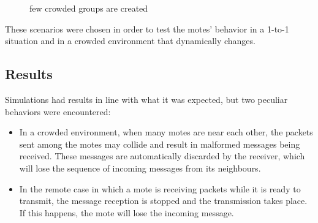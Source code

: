 \documentclass[11pt]{article}
\begin{document}
\begin{figure}[H]
\begin{minipage}{0.32\textwidth}
  \end{minipage}
  \begin{minipage}{0.32\textwidth}
    \centering
    \caption{few crowded groups are created}
    \label{crowded-groups}

  \end{minipage}
\end{figure}

These scenarios were chosen in order to test the motes' behavior in a 1-to-1 situation and in a crowded environment that dynamically changes.

\subsection{Results}
Simulations had results in line with what it was expected, but two peculiar behaviors were encountered:

\begin{itemize}
  \item In a crowded environment, when many motes are near each other, the packets sent among the motes may collide and result in malformed messages being received. These messages are automatically discarded by the receiver, which will lose the sequence of incoming messages from its neighbours.
  \item In the remote case in which a mote is receiving packets while it is ready to transmit, the message reception is stopped and the transmission takes place. If this happens, the mote will lose the incoming message.
\end{itemize}
\end{document}
